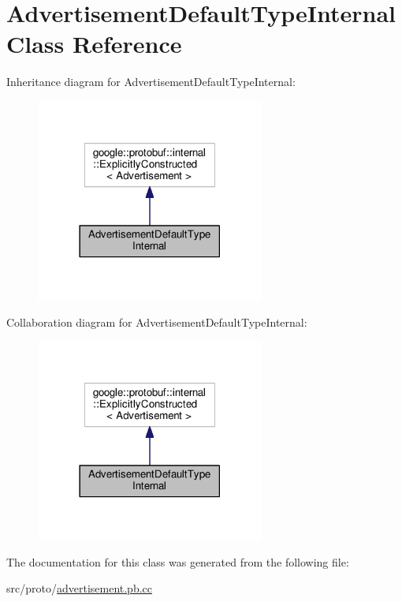 \hypertarget{class_advertisement_default_type_internal}{}\section{Advertisement\+Default\+Type\+Internal Class Reference}
\label{class_advertisement_default_type_internal}


Inheritance diagram for Advertisement\+Default\+Type\+Internal\+:\nopagebreak
\begin{figure}[H]
\begin{center}
\leavevmode
\includegraphics[width=213pt]{class_advertisement_default_type_internal__inherit__graph}
\end{center}
\end{figure}


Collaboration diagram for Advertisement\+Default\+Type\+Internal\+:\nopagebreak
\begin{figure}[H]
\begin{center}
\leavevmode
\includegraphics[width=213pt]{class_advertisement_default_type_internal__coll__graph}
\end{center}
\end{figure}


The documentation for this class was generated from the following file\+:\begin{DoxyCompactItemize}
\item 
src/proto/\hyperlink{advertisement_8pb_8cc}{advertisement.\+pb.\+cc}\end{DoxyCompactItemize}
